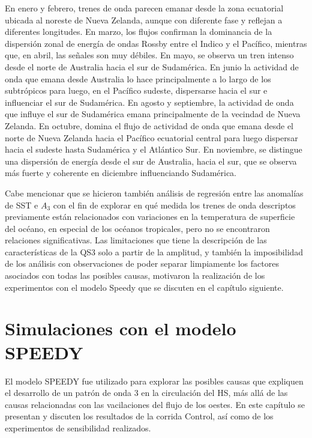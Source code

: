 \documentclass[spanish,a4paper,12pt,oneside]{book}
\begin{document}
En enero y febrero, trenes de onda parecen emanar desde la zona
ecuatorial ubicada al noreste de Nueva Zelanda, aunque con diferente
fase y reflejan a diferentes longitudes. En marzo, los flujos confirman
la dominancia de la dispersión zonal de energía de ondas Rossby entre el
Indico y el Pacífico, mientras que, en abril, las señales son muy
débiles. En mayo, se observa un tren intenso desde el norte de Australia
hacia el sur de Sudamérica. En junio la actividad de onda que emana
desde Australia lo hace principalmente a lo largo de los subtrópicos
para luego, en el Pacífico sudeste, dispersarse hacia el sur e
influenciar el sur de Sudamérica. En agosto y septiembre, la actividad
de onda que influye el sur de Sudamérica emana principalmente de la
vecindad de Nueva Zelanda. En octubre, domina el flujo de actividad de
onda que emana desde el norte de Nueva Zelanda hacia el Pacífico
ecuatorial central para luego dispersar hacia el sudeste hasta
Sudamérica y el Atlántico Sur. En noviembre, se distingue una dispersión
de energía desde el sur de Australia, hacia el sur, que se observa más
fuerte y coherente en diciembre influenciando Sudamérica.

Cabe mencionar que se hicieron también análisis de regresión entre las
anomalías de SST e \(A_3\) con el fin de explorar en qué medida los
trenes de onda descriptos previamente están relacionados con variaciones
en la temperatura de superficie del océano, en especial de los océanos
tropicales, pero no se encontraron relaciones significativas. Las
limitaciones que tiene la descripción de las características de la QS3
solo a partir de la amplitud, y también la imposibilidad de los análisis
con observaciones de poder separar limpiamente los factores asociados
con todas las posibles causas, motivaron la realización de los
experimentos con el modelo Speedy que se discuten en el capítulo
siguiente.

\chapter{Simulaciones con el modelo
SPEEDY}\label{simulaciones-con-el-modelo-speedy}

El modelo SPEEDY fue utilizado para explorar las posibles causas que
expliquen el desarrollo de un patrón de onda 3 en la circulación del HS,
más allá de las causas relacionadas con las vacilaciones del flujo de
los oestes. En este capítulo se presentan y discuten los resultados de
la corrida Control, así como de los experimentos de sensibilidad
realizados.
\end{document}
